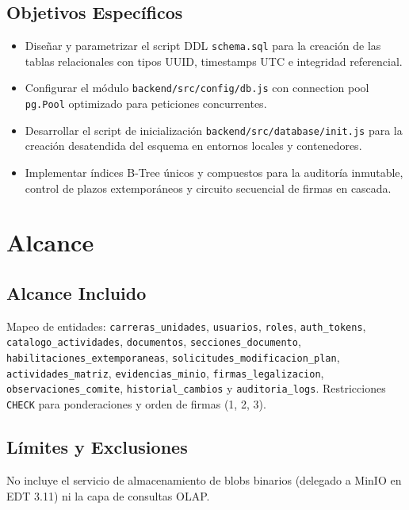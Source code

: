 \documentclass[11pt,a4paper]{article}
\begin{document}
\subsection{Objetivos Específicos}
\begin{itemize}[leftmargin=1.5em, itemsep=1.5pt, topsep=1.5pt]
    \item Diseñar y parametrizar el script DDL \texttt{schema.sql} para la creación de las tablas relacionales con tipos UUID, timestamps UTC e integridad referencial.
    \item Configurar el módulo \texttt{backend/src/config/db.js} con connection pool \texttt{pg.Pool} optimizado para peticiones concurrentes.
    \item Desarrollar el script de inicialización \texttt{backend/src/database/init.js} para la creación desatendida del esquema en entornos locales y contenedores.
    \item Implementar índices B-Tree únicos y compuestos para la auditoría inmutable, control de plazos extemporáneos y circuito secuencial de firmas en cascada.
\end{itemize}

\section{Alcance}

\subsection{Alcance Incluido}
Mapeo de entidades: \texttt{carreras\_unidades}, \texttt{usuarios}, \texttt{roles}, \texttt{auth\_tokens}, \texttt{catalogo\_actividades}, \texttt{documentos}, \texttt{secciones\_documento}, \texttt{habilitaciones\_extemporaneas}, \texttt{solicitudes\_modificacion\_plan}, \texttt{actividades\_matriz}, \texttt{evidencias\_minio}, \texttt{firmas\_legalizacion}, \texttt{observaciones\_comite}, \texttt{historial\_cambios} y \texttt{auditoria\_logs}. Restricciones \texttt{CHECK} para ponderaciones y orden de firmas (1, 2, 3).

\subsection{Límites y Exclusiones}
No incluye el servicio de almacenamiento de blobs binarios (delegado a MinIO en EDT 3.11) ni la capa de consultas OLAP.
\end{document}
